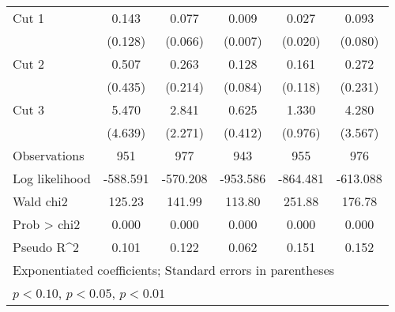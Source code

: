 \begin{table}[htbp]
\begin{tabular}{l*{5}{c}}
Cut 1               &       0.143\sym{**} &       0.077\sym{***}&       0.009\sym{***}&       0.027\sym{***}&       0.093\sym{***}\\
                    &     (0.128)         &     (0.066)         &     (0.007)         &     (0.020)         &     (0.080)         \\
Cut 2               &       0.507         &       0.263         &       0.128\sym{***}&       0.161\sym{**} &       0.272         \\
                    &     (0.435)         &     (0.214)         &     (0.084)         &     (0.118)         &     (0.231)         \\
Cut 3               &       5.470\sym{**} &       2.841         &       0.625         &       1.330         &       4.280\sym{*}  \\
                    &     (4.639)         &     (2.271)         &     (0.412)         &     (0.976)         &     (3.567)         \\
\hline
Observations        &         951         &         977         &         943         &         955         &         976         \\
Log likelihood      &    -588.591         &    -570.208         &    -953.586         &    -864.481         &    -613.088         \\
Wald chi2           &      125.23         &      141.99         &      113.80         &      251.88         &      176.78         \\
Prob > chi2         &       0.000         &       0.000         &       0.000         &       0.000         &       0.000         \\
Pseudo R^2          &       0.101         &       0.122         &       0.062         &       0.151         &       0.152         \\
\hline\hline
\multicolumn{6}{l}{\footnotesize Exponentiated coefficients; Standard errors in parentheses}\\
\multicolumn{6}{l}{\footnotesize \sym{*} \(p<0.10\), \sym{**} \(p<0.05\), \sym{***} \(p<0.01\)}\\
\end{tabular}
\end{table}
